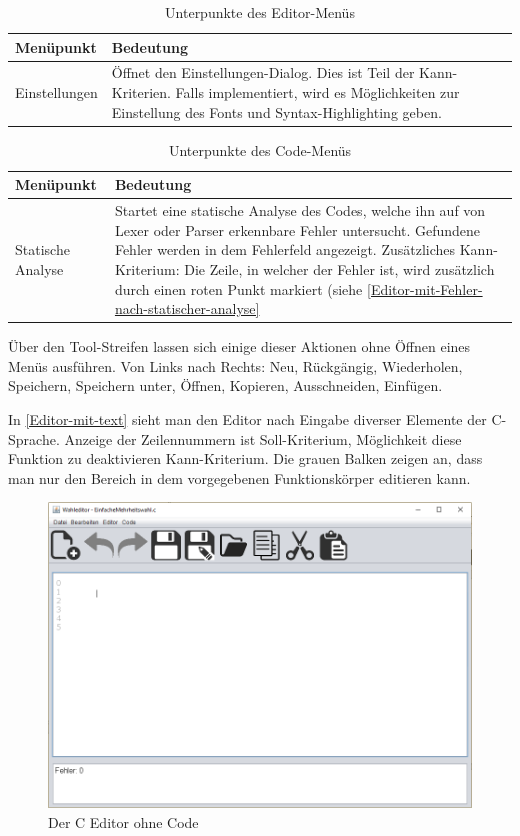 \documentclass[a4paper]{scrreprt}
\begin{document}
\begin{table}[H]
\begin{tabular}{|p{3cm}|p{12cm}|}
Menüpunkt & Bedeutung \\
\hline
Einstellungen & Öffnet den Einstellungen-Dialog. Dies ist Teil der Kann-Kriterien. Falls implementiert, wird es Möglichkeiten zur Einstellung des Fonts und Syntax-Highlighting geben.
\end{tabular}
\label{Editor-Menüpunkte}
\caption{Unterpunkte des Editor-Menüs}
\end{table}

\begin{table}[H]
\begin{tabular}{|p{3cm}|p{12cm}|}
Menüpunkt & Bedeutung \\
\hline
Statische Analyse & Startet eine statische Analyse des Codes, welche ihn auf von Lexer oder Parser erkennbare Fehler untersucht. Gefundene Fehler werden in dem Fehlerfeld angezeigt. Zusätzliches Kann-Kriterium: Die Zeile, in welcher der Fehler ist, wird zusätzlich durch einen roten Punkt markiert (siehe \ref{Editor-mit-Fehler-nach-statischer-analyse}
\end{tabular}
\label{Editor-Menüpunkte}
\caption{Unterpunkte des Code-Menüs}
\end{table}

Über den Tool-Streifen lassen sich einige dieser Aktionen ohne Öffnen eines Menüs ausführen. Von Links nach Rechts: Neu, Rückgängig, Wiederholen, Speichern, Speichern unter, Öffnen, Kopieren, Ausschneiden, Einfügen.

In \ref{Editor-mit-text} sieht man den Editor nach Eingabe diverser Elemente der C-Sprache. Anzeige der Zeilennummern ist Soll-Kriterium, Möglichkeit diese Funktion zu deaktivieren Kann-Kriterium. Die grauen Balken zeigen an, dass man nur den Bereich in dem vorgegebenen Funktionskörper editieren kann.

\begin{figure}[H]
\includegraphics[scale=0.5]{Editor-ohne-text.png}
\caption{Der C Editor ohne Code}
\end{figure}
\end{document}
